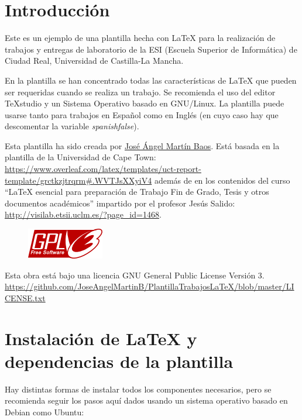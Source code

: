 \documentclass[11pt]{article}
\begin{document}
\begin{titlepage}
	\vfill
	
\end{titlepage}


\tableofcontents
\pagebreak



\section{Introducción}
Este es un ejemplo de una plantilla hecha con \LaTeX{} para la realización de trabajos y entregas de laboratorio de la ESI (Escuela Superior de Informática) de Ciudad Real, Universidad de Castilla-La Mancha. 

En la plantilla se han concentrado todas las características de \LaTeX{} que pueden ser requeridas cuando se realiza un trabajo. Se recomienda el uso del editor TeXstudio y un Sistema Operativo basado en GNU/Linux. La plantilla puede usarse tanto para trabajos en Español como en Inglés (en cuyo caso hay que descomentar la variable \emph{spanishfalse}).

Esta plantilla ha sido creada por \href{https://github.com/JoseAngelMartinB}{José Ángel Martín Baos}. Está basada en la plantilla de la Universidad de Cape Town: \url{https://www.overleaf.com/latex/templates/uct-report-template/grctkzjtrqrm#.WVTJsXXyiV4} además de en los contenidos del curso “\LaTeX{} esencial para preparación de Trabajo Fin de Grado, Tesis y otros documentos académicos” impartido por el profesor Jesús Salido: \url{http://visilab.etsii.uclm.es/?page_id=1468}.

\begin{figure}[H] 
	\centering
	\includegraphics[angle=0]{licencia}
\end{figure}	
Esta obra está bajo una licencia GNU General Public License Versión 3.
\url{https://github.com/JoseAngelMartinB/PlantillaTrabajosLaTeX/blob/master/LICENSE.txt}


\section{Instalación de \LaTeX{} y dependencias de la plantilla}
Hay distintas formas de instalar todos los componentes necesarios, pero se recomienda seguir los pasos aquí dados usando un sistema operativo basado en Debian como Ubuntu:
\end{document}
